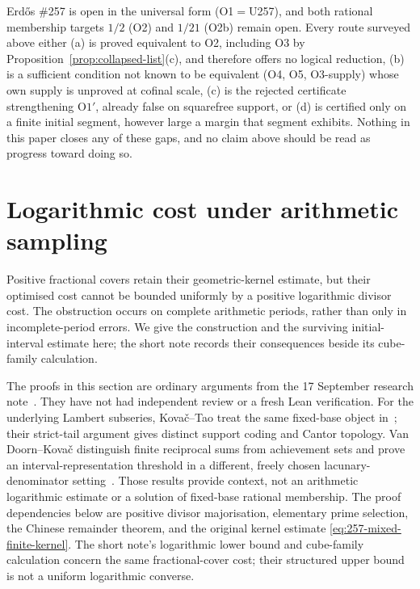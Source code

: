 Erd\H{o}s \#257 is open in the universal form (O1${}={}$U257), and both rational
membership targets $1/2$ (O2) and $1/21$ (O2b) remain open. Every route surveyed above either
(a) is proved equivalent to O2, including O3 by Proposition~\ref{prop:collapsed-list}(c), and
therefore offers no logical reduction, (b) is a sufficient condition not known to be equivalent
(O4, O5, O3-supply) whose own supply is unproved at cofinal scale, (c) is the rejected
certificate strengthening $\mathrm{O1'}$, already false on squarefree support, or (d) is certified
only on a finite initial segment, however large a margin that segment exhibits. Nothing in this
paper closes any of these gaps, and no claim above should be read as progress toward doing so.

\clearpage
\section{Logarithmic cost under arithmetic sampling}\label{sec:257-logarithmic-sampling}
Positive fractional covers retain their geometric-kernel estimate, but their
optimised cost cannot be bounded uniformly by a positive logarithmic divisor
cost.  The obstruction occurs on complete arithmetic periods, rather than
only in incomplete-period errors.  We give the construction and the surviving
initial-interval estimate here; the short note records their consequences
beside its cube-family calculation.

The proofs in this section are ordinary arguments from the 17 September
research note~\cite[Theorem~1, Corollary~3 and Proposition~4]{endpoint2026}.
They have not had independent review or a fresh Lean verification.
For the underlying Lambert subseries, Kova\v{c}--Tao treat the same fixed-base
object in~\cite[Section~2.1.2 and Remark~4.1]{kovactao}; their strict-tail
argument gives distinct support coding and Cantor topology.
Van Doorn--Kova\v{c} distinguish finite reciprocal sums from achievement sets
and prove an interval-representation threshold in a different, freely chosen
lacunary-denominator setting~\cite[Theorem~1, Lemma~4 and Corollary~5]{vandoornkovac}.
Those results provide context, not an arithmetic logarithmic estimate or a
solution of fixed-base rational membership.  The proof dependencies below
are positive divisor majorisation, elementary prime selection, the Chinese
remainder theorem, and the original kernel estimate
\eqref{eq:257-mixed-finite-kernel}.  The short note's logarithmic lower bound
and cube-family calculation concern the same fractional-cover cost; their
structured upper bound is not a uniform logarithmic converse.

